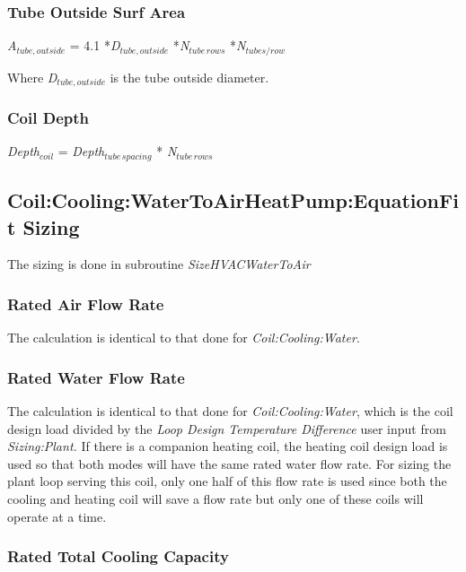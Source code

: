 \subsubsection{Tube Outside Surf Area}\label{tube-outside-surf-area}

\emph{A\(_{tube,outside}\)} = 4.1 *\emph{D\(_{tube,outside}\)} *\emph{N\(_{tube\, rows}\)} *\emph{N\(_{tubes/row}\)}

Where \emph{D\(_{tube,outside}\)} is the tube outside diameter.

\subsubsection{Coil Depth}\label{coil-depth}

\emph{Depth\(_{coil}\)} = \emph{Depth\(_{tube\, spacing}\)} * \emph{N\(_{tube\, rows}\)}

\subsection{Coil:Cooling:WaterToAirHeatPump:EquationFit Sizing}\label{coilcoolingwatertoairheatpumpequationfit-sizing}

The sizing is done in subroutine \emph{SizeHVACWaterToAir}

\subsubsection{Rated Air Flow Rate}\label{rated-air-flow-rate}

The calculation is identical to that done for \emph{Coil:Cooling:Water}.

\subsubsection{Rated Water Flow Rate}\label{rated-water-flow-rate}

The calculation is identical to that done for \emph{Coil:Cooling:Water}, which is the coil design load divided by the \emph{Loop Design Temperature Difference} user input from \emph{Sizing:Plant.} If there is a companion heating coil, the heating coil design load is used so that both modes will have the same rated water flow rate. For sizing the plant loop serving this coil, only one half of this flow rate is used since both the cooling and heating coil will save a flow rate but only one of these coils will operate at a time.

\subsubsection{Rated Total Cooling Capacity}\label{rated-total-cooling-capacity}

